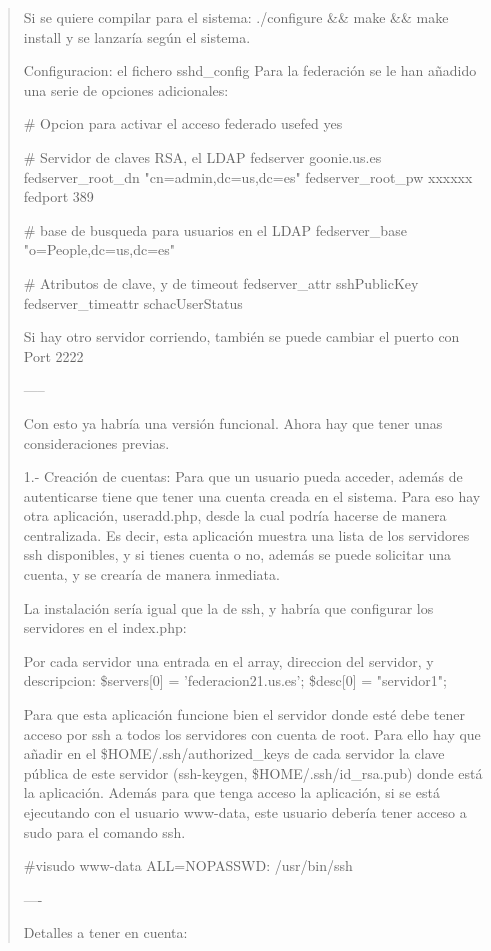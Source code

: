 \begin{quote}
Si se quiere compilar para el sistema:
./configure \&\& make \&\& make install
y se lanzaría según el sistema.

Configuracion: el fichero sshd\_config
Para la federación se le han añadido una serie de opciones adicionales:

\# Opcion para activar el acceso federado
usefed yes

\# Servidor de claves RSA, el LDAP
fedserver goonie.us.es
fedserver\_root\_dn "cn=admin,dc=us,dc=es"
fedserver\_root\_pw xxxxxx
fedport 389

\# base de busqueda para usuarios en el LDAP
fedserver\_base "o=People,dc=us,dc=es"

\# Atributos de clave, y de timeout
fedserver\_attr sshPublicKey
fedserver\_timeattr schacUserStatus

Si hay otro servidor corriendo, también se puede cambiar el puerto con
Port 2222

-----

Con esto ya habría una versión funcional. Ahora hay que tener unas
consideraciones previas.

1.- Creación de cuentas:
Para que un usuario pueda acceder, además de autenticarse tiene que
tener una cuenta creada en el sistema. Para eso hay otra aplicación,
useradd.php, desde la cual podría hacerse de manera centralizada. Es
decir, esta aplicación muestra una lista de los servidores ssh
disponibles, y si tienes cuenta o no, además se puede solicitar una
cuenta, y se crearía de manera inmediata.

La instalación sería igual que la de ssh, y habría que configurar los
servidores en el index.php:

Por cada servidor una entrada en el array, direccion del servidor, y
descripcion:
\$servers[0] = 'federacion21.us.es';
\$desc[0] = "servidor1";

Para que esta aplicación funcione bien el servidor donde esté debe
tener acceso por ssh a todos los servidores con cuenta de root. Para
ello hay que añadir en el \$HOME/.ssh/authorized\_keys de cada servidor la
clave pública de este servidor (ssh-keygen, \$HOME/.ssh/id\_rsa.pub) donde
está la aplicación.
Además para que tenga acceso la aplicación, si se está ejecutando con el
usuario www-data, este usuario debería tener acceso a sudo para el
comando ssh.

\#visudo
www-data ALL=NOPASSWD: /usr/bin/ssh

----

Detalles a tener en cuenta:


\end{quote}
